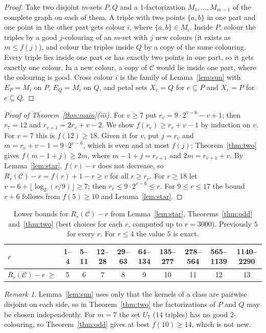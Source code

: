 \documentclass[11pt]{amsart}
\theoremstyle{definition}
\theoremstyle{remark}
\newtheorem{remark}[theorem]{Remark}
\newcommand{\C}{\mathcal{C}}
\begin{document}
\begin{proof}
Take two disjoint $m$-sets $P,Q$ and a $1$-factorization $M_1,\dots,M_{m-1}$ of the complete graph on each of them.
A triple with two points $\{a,b\}$ in one part and one point in the other part gets colour $i$, where $\{a,b\}\in M_i$.
Inside $P$, colour the triples by a good $j$-colouring of an $m$-set with $j$ new colours (it exists as $m\le f(j)$),
and colour the triples inside $Q$ by a copy of the same colouring. Every triple lies inside one part or has exactly two
points in one part, so it gets exactly one colour. In a new colour, a copy of $\C$ would lie inside one part, where the
colouring is good. Cross colour $i$ is the family of Lemma~\ref{lem:sun} with $E_P=M_i$ on $P$, $E_Q=M_i$ on $Q$, and
petal sets $X_e=Q$ for $e\subseteq P$ and $X_e=P$ for $e\subseteq Q$.
\end{proof}

\begin{proof}[Proof of Theorem~\textup{\ref{thm:main}(iii)}]
For $v\ge7$ put $r_v=9\cdot2^{v-6}-v+1$; then $r_7=12$ and $r_{v+1}=2r_v+v-2$. We show $f(r_v)\ge r_v+v-1$ by induction
on $v$. For $v=7$ this is $f(12)\ge18$. Given it for $v$, put $j=r_v$ and $m=r_v+v-1=9\cdot2^{v-6}$, which is even and at
most $f(j)$; Theorem~\ref{thm:two} gives $f(m-1+j)\ge2m$, where $m-1+j=r_{v+1}$ and $2m=r_{v+1}+v$. By
Lemma~\ref{lem:star}, $f(r)-r$ does not decrease, so $R_r(\C)-r=f(r)+1-r\ge v$ for all $r\ge r_v$. For $r\ge18$ let
$v=6+\lfloor\log_2(r/9)\rfloor\ge7$; then $r_v\le9\cdot2^{v-6}\le r$. For $9\le r\le17$ the bound $r+6$ follows from
$f(5)\ge10$ and Lemma~\ref{lem:star}.
\end{proof}

\begin{table}[ht]
\centering
\begin{tabular}{lccccccccc}
\toprule
$r$ & 1--4 & 5--11 & 12--28 & 29--63 & 64--134 & 135--277 & 278--564 & 565--1139 & 1140--2290\\
\midrule
$R_r(\C)-r\ \ge$ & 5 & 6 & 7 & 8 & 9 & 10 & 11 & 12 & 13\\
\bottomrule
\end{tabular}
\caption{Lower bounds for $R_r(\C)-r$ from Lemma~\ref{lem:star}, Theorems~\ref{thm:odd} and~\ref{thm:two} (best
choices for each $r$, computed up to $r=3000$). Previously $5$ for every $r$. For $r\le4$ the value $5$ is exact.}
\label{tab:bounds}
\end{table}

\begin{remark}
Lemma~\ref{lem:sun} uses only that the kernels of a class are pairwise disjoint on each side, so in
Theorem~\ref{thm:two} the factorizations of $P$ and $Q$ may be chosen independently. For $m=7$ the set $U_7$
($14$ triples) has no good $2$-colouring, so Theorem~\ref{thm:odd} gives at best $f(10)\ge14$, which is not new.
\end{remark}
\end{document}
